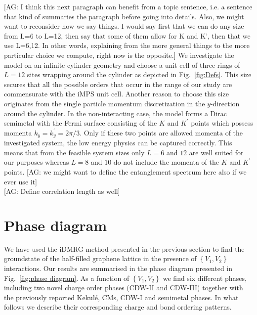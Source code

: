 \documentclass[aps,prx,10pt,twocolumn,floatfix,superscriptaddress,showpacs,numerical,footinbib]{revtex4-1}
\newcommand{\noteAG}[1]{{\color{blue} [AG: #1]}}
\begin{document}
\noteAG{I think this next paragraph can benefit from a topic sentence, i.e. a sentence that kind of summaries the paragraph before going into details.
Also, we might want to reconsider how we say things. I would say first that we can do any size from L=6 to L=12, then say that some of them allow for K and K', then that we use 
L=6,12. In other words, explaining from the more general things to the more particular choice we compute, right now is the opposite.}
We investigate the model on an infinite cylinder geometry and choose a unit cell of three rings of $L=12$ sites wrapping around the cylinder as depicted in Fig.~\ref{fig:Defs}. 
%
This size secures that all the possible orders that occur in the range of our study are commensurate with the iMPS unit cell. 
%
Another reason to choose this size originates from the single particle momentum discretization in the $y$-direction around the cylinder. 
%
In the non-interacting case, the model forms a Dirac semimetal with the Fermi surface consisting of the $K$ and $K^{\prime}$ points which possess momenta $k_y=k_y^{\prime} = 2\pi / 3$. 
%
Only if these two points are allowed momenta of the investigated system, the low energy physics can be captured correctly. 
%
This means that from the feasible system sizes only $L=6$ and $12$ are well suited for our purposes whereas $L=8$ and $10$ do not include the momenta of the $K$ and $K^{\prime}$ points.
%
\noteAG{we might want to define the entanglement spectrum here also if we ever use it}\\
\noteAG{Define correlation length as well}
%

\section{\label{sec:phasediagram}Phase diagram}
%
We have used the iDMRG method presented in the previous section
to find the groundstate of the half-filled graphene lattice in the presence of 
$\left\lbrace V_{1},V_{2}\right\rbrace$ interactions.
%
Our results are summarised in the phase diagram presented in Fig.~\ref{fig:phase diagram}.
%
As a function of $\left\lbrace V_{1},V_{2}\right\rbrace$ we find six different phases, 
including two novel charge order phases (CDW-II and CDW-III) together with the previously 
reported Kekul\'{e}, CMs, CDW-I and semimetal phases.
%
In what follows we describe their corresponding charge and bond ordering patterns.
%
\end{document}
